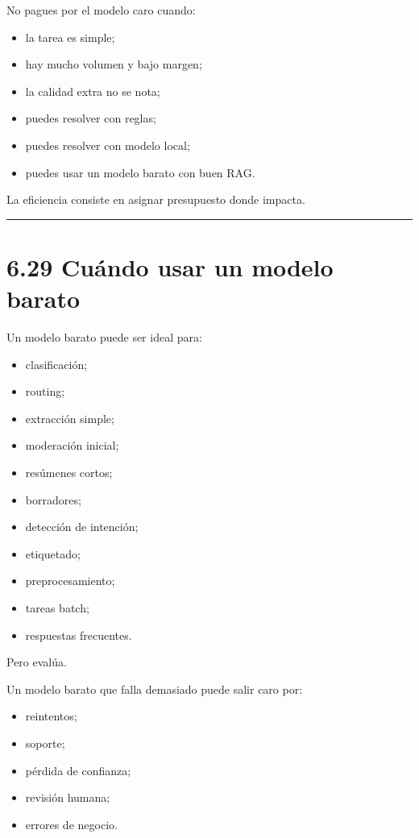 No pagues por el modelo caro cuando:

\begin{itemize}
\tightlist
\item
  la tarea es simple;
\item
  hay mucho volumen y bajo margen;
\item
  la calidad extra no se nota;
\item
  puedes resolver con reglas;
\item
  puedes resolver con modelo local;
\item
  puedes usar un modelo barato con buen RAG.
\end{itemize}

La eficiencia consiste en asignar presupuesto donde impacta.

\begin{center}\rule{0.5\linewidth}{0.5pt}\end{center}

\section{6.29 Cuándo usar un modelo
barato}\label{cuuxe1ndo-usar-un-modelo-barato}

Un modelo barato puede ser ideal para:

\begin{itemize}
\tightlist
\item
  clasificación;
\item
  routing;
\item
  extracción simple;
\item
  moderación inicial;
\item
  resúmenes cortos;
\item
  borradores;
\item
  detección de intención;
\item
  etiquetado;
\item
  preprocesamiento;
\item
  tareas batch;
\item
  respuestas frecuentes.
\end{itemize}

Pero evalúa.

Un modelo barato que falla demasiado puede salir caro por:

\begin{itemize}
\tightlist
\item
  reintentos;
\item
  soporte;
\item
  pérdida de confianza;
\item
  revisión humana;
\item
  errores de negocio.
\end{itemize}

